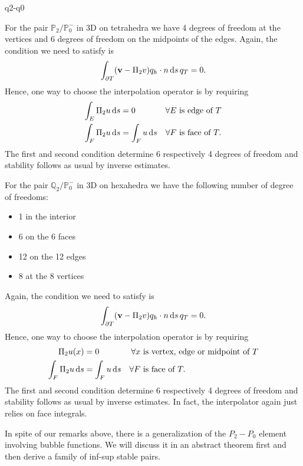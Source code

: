 \begin{Problem}{q2-q0}
\begin{solution}
  For the pair $\mathbb{P}_2/\mathbb{P}_0^-$ in 3D on tetrahedra we have
  4 degrees of freedom at the vertices and 6 degrees of freedom on the midpoints of the edges.
  Again, the condition we need to satisfy is
  \begin{align}
    \int_{\partial T} (\mathbf v-\Pi_2v)q_h \cdot n \,\mathrm{d} s \,q_T = 0.
  \end{align}
  Hence, one way to choose the interpolation operator is by requiring
  \begin{align}
    \int_E \Pi_2 u\,\mathrm{d} s &= 0           & \forall E &\text{ is edge of } T\\
    \int_F \Pi_2 u\,\mathrm{d} s &= \int_F u\,\mathrm{d} s & \forall F &\text{ is face of } T.
  \end{align}
  The first and second condition determine 6 respectively 4 degrees of freedom
  and stability follows as usual by inverse estimates.

  For the pair $\mathbb{Q}_2/\mathbb{P}_0^-$ in 3D on hexahedra we have the
  following number of degree of freedoms:
  \begin{itemize}
  \item 1 in the interior
  \item 6 on the 6 faces
  \item 12 on the 12 edges
  \item 8 at the 8 vertices
  \end{itemize}
  Again, the condition we need to satisfy is
  \begin{align}
    \int_{\partial T} (\mathbf v-\Pi_2v)q_h \cdot n \,\mathrm{d} s \,q_T = 0.
  \end{align}
  Hence, one way to choose the interpolation operator is by requiring
  \begin{align}
    \Pi_2 u(x)        &= 0           & \forall x &\text{ is vertex, edge or midpoint of } T\\
    \int_F \Pi_2 u\,\mathrm{d} s &= \int_F u\,\mathrm{d} s & \forall F &\text{ is face of } T.
  \end{align}
  The first and second condition determine 6 respectively 4 degrees of freedom
  and stability follows as usual by inverse estimates. In fact, the interpolator again
  just relies on face integrals.
\end{solution}
\end{Problem}

\begin{intro}
  In spite of our remarks above, there is a generalization of the
  $P_2-P_0$ element involving bubble functions. We will discuss it in
  an abstract theorem first and then derive a family of inf-sup stable
  pairs.
\end{intro}

